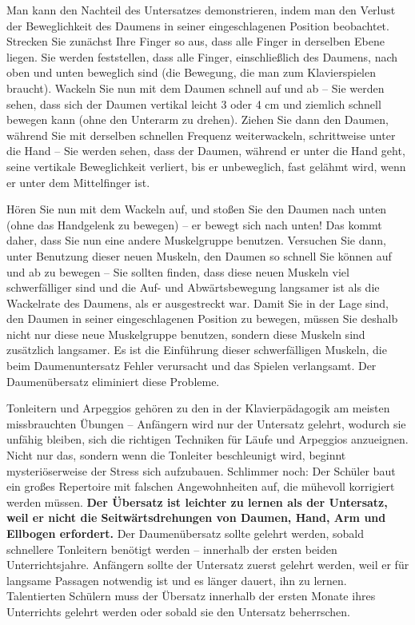 Man kann den Nachteil des Untersatzes demonstrieren, indem man den Verlust der Beweglichkeit des Daumens in seiner eingeschlagenen Position beobachtet.
Strecken Sie zunächst Ihre Finger so aus, dass alle Finger in derselben Ebene liegen.
Sie werden feststellen, dass alle Finger, einschließlich des Daumens, nach oben und unten beweglich sind (die Bewegung, die man zum Klavierspielen braucht).
Wackeln Sie nun mit dem Daumen schnell auf und ab -- Sie werden sehen, dass sich der Daumen vertikal leicht 3 oder 4 cm und ziemlich schnell bewegen kann (ohne den Unterarm zu drehen).
Ziehen Sie dann den Daumen, während Sie mit derselben schnellen Frequenz weiterwackeln, schrittweise unter die Hand -- Sie werden sehen, dass der Daumen, während er unter die Hand geht, seine vertikale Beweglichkeit verliert, bis er unbeweglich, fast gelähmt wird, wenn er unter dem Mittelfinger ist.

Hören Sie nun mit dem Wackeln auf, und stoßen Sie den Daumen nach unten (ohne das Handgelenk zu bewegen) -- er bewegt sich nach unten!
Das kommt daher, dass Sie nun eine andere Muskelgruppe benutzen.
Versuchen Sie dann, unter Benutzung dieser neuen Muskeln, den Daumen so schnell Sie können auf und ab zu bewegen -- Sie sollten finden, dass diese neuen Muskeln viel schwerfälliger sind und die Auf- und Abwärtsbewegung langsamer ist als die Wackelrate des Daumens, als er ausgestreckt war.
Damit Sie in der Lage sind, den Daumen in seiner eingeschlagenen Position zu bewegen, müssen Sie deshalb nicht nur diese neue Muskelgruppe benutzen, sondern diese Muskeln sind zusätzlich langsamer.
Es ist die Einführung dieser schwerfälligen Muskeln, die beim Daumenuntersatz Fehler verursacht und das Spielen verlangsamt.
Der Daumenübersatz eliminiert diese Probleme.

Tonleitern und Arpeggios gehören zu den in der Klavierpädagogik am meisten missbrauchten Übungen -- Anfängern wird nur der Untersatz gelehrt, wodurch sie unfähig bleiben, sich die richtigen Techniken für Läufe und Arpeggios anzueignen.
Nicht nur das, sondern wenn die Tonleiter beschleunigt wird, beginnt mysteriöserweise der Stress sich aufzubauen.
Schlimmer noch: Der Schüler baut ein großes Repertoire mit falschen Angewohnheiten auf, die mühevoll korrigiert werden müssen.
\textbf{Der Übersatz ist leichter zu lernen als der Untersatz, weil er nicht die Seitwärtsdrehungen von Daumen, Hand, Arm und Ellbogen erfordert.}
Der Daumenübersatz sollte gelehrt werden, sobald schnellere Tonleitern benötigt werden -- innerhalb der ersten beiden Unterrichtsjahre.
Anfängern sollte der Untersatz zuerst gelehrt werden, weil er für langsame Passagen notwendig ist und es länger dauert, ihn zu lernen.
Talentierten Schülern muss der Übersatz innerhalb der ersten Monate ihres Unterrichts gelehrt werden oder sobald sie den Untersatz beherrschen.

